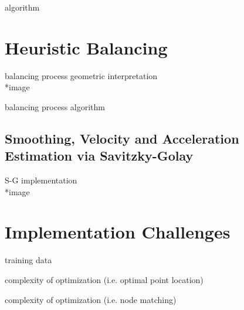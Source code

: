 algorithm\\

\section{Heuristic Balancing} \label{sec:impl-heuristic}

balancing process geometric interpretation\\
*image

balancing process algorithm

\subsection{Smoothing, Velocity and Acceleration Estimation via Savitzky-Golay} \label{subsec:impl-heuristic-vel}

S-G implementation\\
*image

\section{Implementation Challenges} \label{sec:impl-implChallenges}

training data

complexity of optimization (i.e. optimal point location)

complexity of optimization (i.e. node matching)